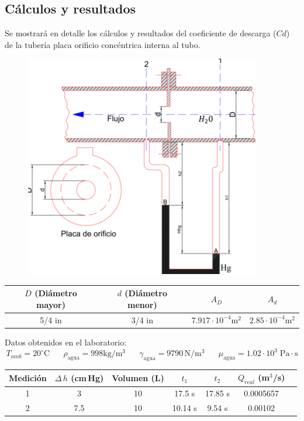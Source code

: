 \documentclass[a4paper,12pt]{report}
\begin{document}
\subsection{Cálculos y resultados}
Se mostrará en detalle los cálculos y resultados del coeficiente de descarga ($Cd$) de la tubería placa orificio concéntrica interna al tubo.
\begin{figure}[H]
\centering
\includegraphics[scale=0.6]{fr1.png}
\end{figure}
\begin{center}
\begin{tabular}{|c|c|c|c|}
\hline 
$D$ (Diámetro mayor) & $d$ (Diámetro menor) & $A_{D}$ & $A_{d}$ \\ 
\hline 
5/4 in & 3/4 in & $7.917\cdot 10^{-4} \mathrm{m^{2}} $ & $2.85\cdot 10^{-4} \mathrm{m^{2}} $ \\ 
\hline 
\end{tabular} 
\end{center}
Datos obtenidos en el laboratorio:
$$
T_{amb} = 20^{\circ}\mathrm{C} \hspace{20pt} \rho_{\mathrm{agua}} = 998 \mathrm{kg/m^{3}} \hspace{20pt} \gamma_{\mathrm{agua}} = 9790\,\mathrm{N/m^{3}} \hspace{20pt} \mu_{\mathrm{agua}} = 1.02\cdot 10^{3}\;\mathrm{Pa \cdot s}
$$
\begin{center}
\begin{tabular}{|c|c|c|c|c|c|c|}
\hline 
Medición & $\Delta\,h$ (cm\,Hg) & Volumen (L) & $t_{1}$ & $t_{2}$ & $Q_{real}$ (m$^{3}$/s) \\ 
\hline 
1 & 3 & 10 & 17.5 s & 17.85 s & 0.0005657 \\ 
\hline 
2 & 7.5 & 10 & 10.14 s & 9.54 s & 0.00102 \\ 
\hline 
\end{tabular} 
\end{center}
\end{document}
